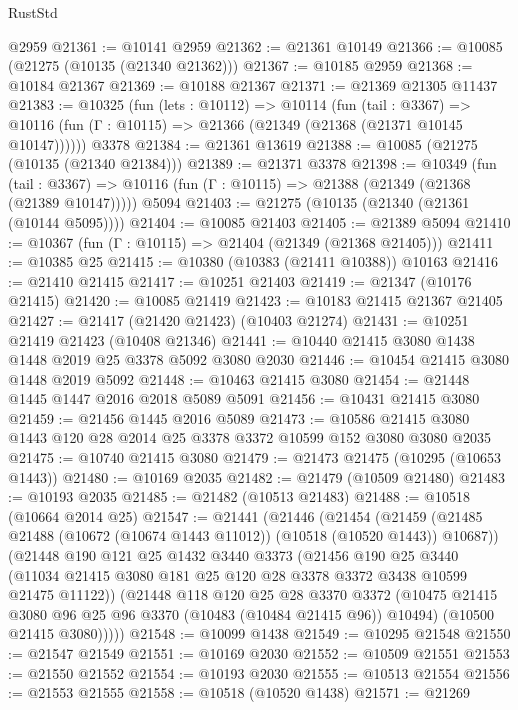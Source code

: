\begin{lexlean}{RustStd}
\begin{coremodule}
    @2959
@21361 := @10141 @2959
@21362 := @21361 @10149
@21366 := @10085 (@21275 (@10135 (@21340 @21362)))
@21367 := @10185 @2959
@21368 := @10184 @21367
@21369 := @10188 @21367
@21371 := @21369 @21305 @11437
@21383 := @10325
    (fun (lets : @10112) =>
    @10114
      (fun (tail : @3367) =>
      @10116 (fun (Γ : @10115) => @21366 (@21349 (@21368 (@21371 @10145 @10147))))))
    @3378
@21384 := @21361 @13619
@21388 := @10085 (@21275 (@10135 (@21340 @21384)))
@21389 := @21371 @3378
@21398 := @10349
    (fun (tail : @3367) => @10116 (fun (Γ : @10115) => @21388 (@21349 (@21368 (@21389 @10147)))))
    @5094
@21403 := @21275 (@10135 (@21340 (@21361 (@10144 @5095))))
@21404 := @10085 @21403
@21405 := @21389 @5094
@21410 := @10367 (fun (Γ : @10115) => @21404 (@21349 (@21368 @21405)))
@21411 := @10385 @25
@21415 := @10380 (@10383 (@21411 @10388)) @10163
@21416 := @21410 @21415
@21417 := @10251 @21403
@21419 := @21347 (@10176 @21415)
@21420 := @10085 @21419
@21423 := @10183 @21415 @21367 @21405
@21427 := @21417 (@21420 @21423) (@10403 @21274)
@21431 := @10251 @21419 @21423 (@10408 @21346)
@21441 := @10440 @21415 @3080 @1438 @1448 @2019 @25 @3378 @5092 @3080 @2030
@21446 := @10454 @21415 @3080 @1448 @2019 @5092
@21448 := @10463 @21415 @3080
@21454 := @21448 @1445 @1447 @2016 @2018 @5089 @5091
@21456 := @10431 @21415 @3080
@21459 := @21456 @1445 @2016 @5089
@21473 := @10586 @21415 @3080 @1443 @120 @28 @2014 @25 @3378 @3372 @10599 @152 @3080 @3080 @2035
@21475 := @10740 @21415 @3080
@21479 := @21473 @21475 (@10295 (@10653 @1443))
@21480 := @10169 @2035
@21482 := @21479 (@10509 @21480)
@21483 := @10193 @2035
@21485 := @21482 (@10513 @21483)
@21488 := @10518 (@10664 @2014 @25)
@21547 := @21441
    (@21446
      (@21454
        (@21459 (@21485 @21488 (@10672 (@10674 @1443 @11012)) (@10518 (@10520 @1443)) @10687))
        (@21448
          @190
          @121
          @25
          @1432
          @3440
          @3373
          (@21456
            @190
            @25
            @3440
            (@11034 @21415 @3080 @181 @25 @120 @28 @3378 @3372 @3438 @10599 @21475 @11122))
          (@21448
            @118
            @120
            @25
            @28
            @3370
            @3372
            (@10475 @21415 @3080 @96 @25 @96 @3370 (@10483 (@10484 @21415 @96)) @10494)
            (@10500 @21415 @3080)))))
@21548 := @10099 @1438
@21549 := @10295 @21548
@21550 := @21547 @21549
@21551 := @10169 @2030
@21552 := @10509 @21551
@21553 := @21550 @21552
@21554 := @10193 @2030
@21555 := @10513 @21554
@21556 := @21553 @21555
@21558 := @10518 (@10520 @1438)
@21571 := @21269

\end{coremodule}
\end{lexlean}
